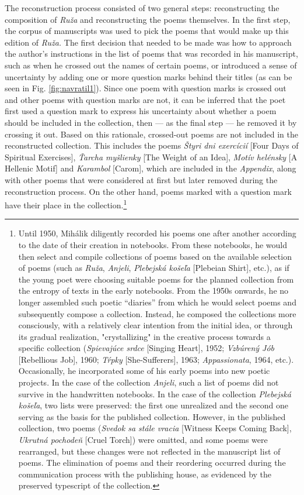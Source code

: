 \documentclass{article}
\begin{document}
The reconstruction process consisted of two general steps:
reconstructing the composition of \emph{Ruža} and reconstructing the
poems themselves. In the first step, the corpus of manuscripts was used
to pick the poems that would make up this edition of \emph{Ruža.} The
first decision that needed to be made was how to approach the author's
instructions in the list of poems that was recorded in his manuscript, such as when he crossed out the names
of certain poems, or introduced a sense of uncertainty by adding one or more
question marks behind their titles (as can be seen in Fig. \ref{fig:navratil1}). Since one poem with question
marks is crossed out and other poems with question marks are not, it can
be inferred that the poet first used a question mark to express his
uncertainty about whether a poem should be included in the collection,
then –– as the final step –– he removed it by crossing it out.
Based on this rationale, crossed-out poems are not included in the reconstructed
collection. This includes the poems \emph{Štyri dni exercícií} [Four
Days of Spiritual Exercises], \emph{Ťarcha myšlienky} [The Weight of an
Idea], \emph{Motív helénsky} [A Hellenic Motif] and \emph{Karambol}
[Carom], which are included in the \emph{Appendix}, along with other
poems that were considered at first but later removed during the
reconstruction process. On the other hand, poems marked with a question
mark have their place in the collection.\footnote{Until 1950, Mihálik
  diligently recorded his poems one after another according to the date
  of their creation in notebooks. From these notebooks, he would then
  select and compile collections of poems based on the available
  selection of poems (such as \emph{Ruža}, \emph{Anjeli},
  \emph{Plebejská košeľa} [Plebeian Shirt], etc.), as if the young poet
  were choosing suitable poems for the planned collection from the
  entropy of texts in the early notebooks. From the 1950s onwards, he no
  longer assembled such poetic ``diaries'' from which he would select
  poems and subsequently compose a collection. Instead, he composed the
  collections more consciously, with a relatively clear intention from
  the initial idea, or through its gradual realization, "crystallizing"
  in the creative process towards a specific collection
  (\emph{Spievajúce srdce} [Singing Heart], 1952; \emph{Vzbúrený Jób}
  [Rebellious Job], 1960; \emph{Tŕpky} [She-Sufferers], 1963;
  \emph{Appassionata}, 1964, etc.). Occasionally, he incorporated some
  of his early poems into new poetic projects. In the case of the
  collection \emph{Anjeli}, such a list of poems did not survive in the
  handwritten notebooks. In the case of the collection \emph{Plebejská
  košeľa}, two lists were preserved: the first one unrealized and the
  second one serving as the basis for the published collection. However,
  in the published collection, two poems (\emph{Svedok sa stále vracia}
  [Witness Keeps Coming Back], \emph{Ukrutná pochodeň} [Cruel Torch])
  were omitted, and some poems were rearranged, but these changes were
  not reflected in the manuscript list of poems. The elimination of
  poems and their reordering occurred during the communication process
  with the publishing house, as evidenced by the preserved typescript of
  the collection.}
\end{document}
